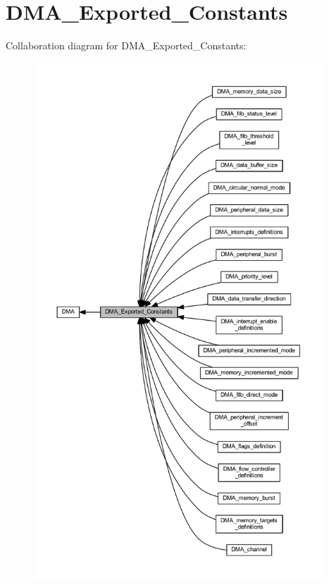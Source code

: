 \hypertarget{group___d_m_a___exported___constants}{}\section{D\+M\+A\+\_\+\+Exported\+\_\+\+Constants}
\label{group___d_m_a___exported___constants}
Collaboration diagram for D\+M\+A\+\_\+\+Exported\+\_\+\+Constants\+:\nopagebreak
\begin{figure}[H]
\begin{center}
\leavevmode
\includegraphics[height=550pt]{group___d_m_a___exported___constants}
\end{center}
\end{figure}
